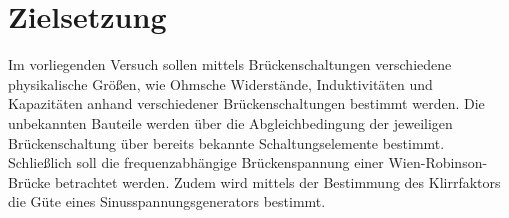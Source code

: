 \setcounter{page}{1}
\section{Zielsetzung}

\label{sec:Zielsetzung}
Im vorliegenden Versuch sollen mittels Brückenschaltungen verschiedene physikalische Größen, wie Ohmsche Widerstände, Induktivitäten und Kapazitäten
anhand verschiedener Brückenschaltungen bestimmt werden.
Die unbekannten Bauteile werden über die Abgleichbedingung der jeweiligen Brückenschaltung über bereits bekannte Schaltungselemente bestimmt.
Schließlich soll die frequenzabhängige Brückenspannung einer Wien-Robinson-Brücke betrachtet werden. Zudem wird mittels der Bestimmung des Klirrfaktors die Güte
eines Sinusspannungsgenerators bestimmt.
